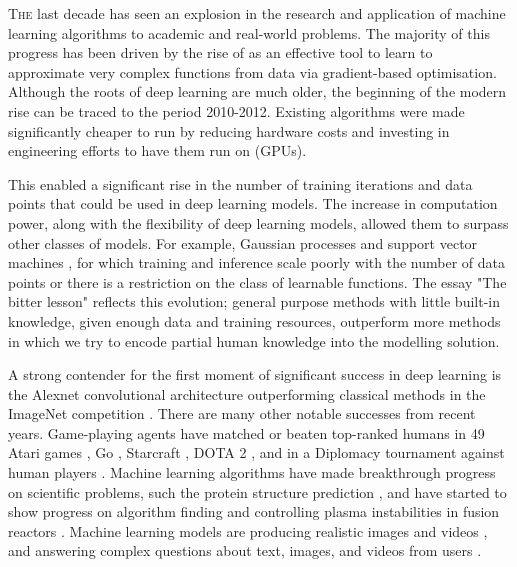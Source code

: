 \lettrine{T}{he} last decade has seen an explosion in the research and application of machine learning algorithms to academic and real-world problems.
The majority of this progress has been driven by the rise of  as an effective tool to learn to approximate very complex functions from data via gradient-based optimisation.
Although the roots of deep learning are much older, the beginning of the modern rise can be traced to the period 2010-2012.
Existing algorithms were made significantly cheaper to run by reducing hardware costs and investing in engineering efforts to have them run on  (GPUs).

This enabled a significant rise in the number of training iterations and data points that could be used in deep learning models.
The increase in computation power, along with the flexibility of deep learning models, allowed them to surpass other classes of models.
For example, Gaussian processes \cite{williams2006gaussian} and support vector machines \cite{boser1992training}, for which training and inference scale poorly with the number of data points or there is a restriction on the class of learnable functions.
The essay "The bitter lesson" \cite{sutton2019} reflects this evolution;
general purpose methods with little built-in knowledge, given enough data and training resources, outperform more methods in which we try to encode partial human knowledge into the modelling solution. 

A strong contender for the first moment of significant success in deep learning is the Alexnet convolutional architecture \parencite{krizhevsky2012imagenet} outperforming classical methods in the ImageNet competition \cite{ILSVRC15}.
There are many other notable successes from recent years.
Game-playing agents have matched or beaten top-ranked humans in 49 Atari games \parencite{mnih2015human}, Go \cite{silver2016mastering}, Starcraft \cite{vinyals2019grandmaster}, DOTA 2 \cite{berner2019dota}, and in a Diplomacy tournament against human players \parencite{meta2022human}.
Machine learning algorithms have made breakthrough progress on scientific problems, such the protein structure prediction \parencite{abramson2024accurate}, and have started to show progress on algorithm finding \cite{fawzi2022discovering} and controlling plasma instabilities in fusion reactors \cite{degrave2022magnetic}.
Machine learning models are producing realistic images and videos \cite{saharia2022photorealistic,betker2023improving}, and answering complex questions about text, images, and videos from users \cite{openai2024gpt4technicalreport,geminiteam2024gemini}.

